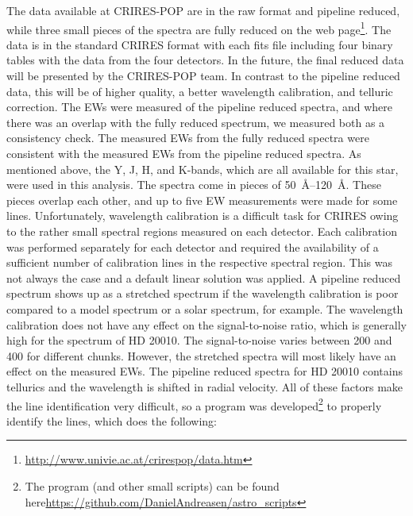 The data available at CRIRES-POP are in the raw format and pipeline reduced, while three small
pieces of the spectra are fully reduced on the web
page\footnote{\url{http://www.univie.ac.at/crirespop/data.htm}}. The data is in the standard CRIRES
format with each fits file including four binary tables with the data from the four detectors. In
the future, the final reduced data will be presented by the CRIRES-POP team. In contrast to the
pipeline reduced data, this will be of higher quality, a better wavelength calibration, and telluric
correction. The EWs were measured of the pipeline reduced spectra, and where there was an overlap
with the fully reduced spectrum, we measured both as a consistency check. The measured EWs from the
fully reduced spectra were consistent with the measured EWs from the pipeline reduced spectra. As
mentioned above, the Y, J, H, and K-bands, which are all available for this star, were used in this
analysis. The spectra come in pieces of \SIrange{50}{120}{\angstrom}. These pieces overlap each
other, and up to five EW measurements were made for some lines. Unfortunately, wavelength
calibration is a difficult task for CRIRES owing to the rather small spectral regions measured on
each detector. Each calibration was performed separately for each detector and required the
availability of a sufficient number of calibration lines in the respective spectral region. This was
not always the case and a default linear solution was applied. A pipeline reduced spectrum shows up
as a stretched spectrum if the wavelength calibration is poor compared to a model spectrum or a
solar spectrum, for example. The wavelength calibration does not have any effect on the
signal-to-noise ratio, which is generally high for the spectrum of HD 20010. The signal-to-noise
varies between 200 and 400 for different chunks. However, the stretched spectra will most likely
have an effect on the measured EWs. The pipeline reduced spectra for HD 20010 contains tellurics and
the wavelength is shifted in radial velocity. All of these factors make the line identification very
difficult, so a program was developed\footnote{The program (and other small scripts) can be found
here\url{https://github.com/DanielAndreasen/astro_scripts}} to properly identify the lines, which
does the following:

